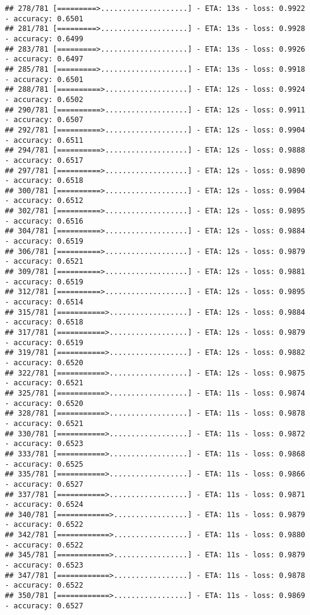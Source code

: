 \documentclass[
]{article}
\begin{document}
\begin{verbatim}
## 278/781 [=========>....................] - ETA: 13s - loss: 0.9922 - accuracy: 0.6501
## 281/781 [=========>....................] - ETA: 13s - loss: 0.9928 - accuracy: 0.6499
## 283/781 [=========>....................] - ETA: 13s - loss: 0.9926 - accuracy: 0.6497
## 285/781 [=========>....................] - ETA: 13s - loss: 0.9918 - accuracy: 0.6501
## 288/781 [==========>...................] - ETA: 12s - loss: 0.9924 - accuracy: 0.6502
## 290/781 [==========>...................] - ETA: 12s - loss: 0.9911 - accuracy: 0.6507
## 292/781 [==========>...................] - ETA: 12s - loss: 0.9904 - accuracy: 0.6511
## 294/781 [==========>...................] - ETA: 12s - loss: 0.9888 - accuracy: 0.6517
## 297/781 [==========>...................] - ETA: 12s - loss: 0.9890 - accuracy: 0.6518
## 300/781 [==========>...................] - ETA: 12s - loss: 0.9904 - accuracy: 0.6512
## 302/781 [==========>...................] - ETA: 12s - loss: 0.9895 - accuracy: 0.6516
## 304/781 [==========>...................] - ETA: 12s - loss: 0.9884 - accuracy: 0.6519
## 306/781 [==========>...................] - ETA: 12s - loss: 0.9879 - accuracy: 0.6521
## 309/781 [==========>...................] - ETA: 12s - loss: 0.9881 - accuracy: 0.6519
## 312/781 [==========>...................] - ETA: 12s - loss: 0.9895 - accuracy: 0.6514
## 315/781 [===========>..................] - ETA: 12s - loss: 0.9884 - accuracy: 0.6518
## 317/781 [===========>..................] - ETA: 12s - loss: 0.9879 - accuracy: 0.6519
## 319/781 [===========>..................] - ETA: 12s - loss: 0.9882 - accuracy: 0.6520
## 322/781 [===========>..................] - ETA: 12s - loss: 0.9875 - accuracy: 0.6521
## 325/781 [===========>..................] - ETA: 11s - loss: 0.9874 - accuracy: 0.6520
## 328/781 [===========>..................] - ETA: 11s - loss: 0.9878 - accuracy: 0.6521
## 330/781 [===========>..................] - ETA: 11s - loss: 0.9872 - accuracy: 0.6523
## 333/781 [===========>..................] - ETA: 11s - loss: 0.9868 - accuracy: 0.6525
## 335/781 [===========>..................] - ETA: 11s - loss: 0.9866 - accuracy: 0.6527
## 337/781 [===========>..................] - ETA: 11s - loss: 0.9871 - accuracy: 0.6524
## 340/781 [============>.................] - ETA: 11s - loss: 0.9879 - accuracy: 0.6522
## 342/781 [============>.................] - ETA: 11s - loss: 0.9880 - accuracy: 0.6522
## 345/781 [============>.................] - ETA: 11s - loss: 0.9879 - accuracy: 0.6523
## 347/781 [============>.................] - ETA: 11s - loss: 0.9878 - accuracy: 0.6522
## 350/781 [============>.................] - ETA: 11s - loss: 0.9869 - accuracy: 0.6527

\end{verbatim}
\end{document}
